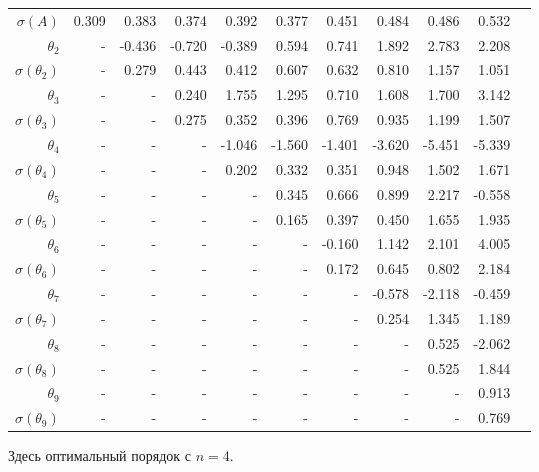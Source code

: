 \documentclass{matmex-diploma-custom}
\begin{document}
\begin{table}[h!!]
\begin{tabular}{r|rrr|r|rrrrrr}
 $\sigma(A) $ & 0.309       &   0.383 &   0.374 &   0.392 &   0.377 &   0.451 &   0.484 &   0.486 &   0.532 \\
 $\theta_2$&-        &  -0.436 &   -0.720 &  -0.389 &   0.594 &   0.741 &   1.892 &   2.783 &   2.208 \\
 $\sigma(\theta_2)$&-      &   0.279 &   0.443 &   0.412 &   0.607 &   0.632 &    0.810 &   1.157 &   1.051 \\
 $\theta_3$&-      &    - &   0.240 &   1.755 &   1.295 &   0.710 &   1.608 &   1.700 &   3.142 \\
 $\sigma(\theta_3)$&-      &    - &   0.275 &   0.352 &   0.396 &   0.769 &   0.935 &   1.199 &   1.507 \\
 $\theta_4$&-      &    - &    - &  -1.046 &  -1.560 &  -1.401 &  -3.620 &  -5.451 &  -5.339 \\
 $\sigma(\theta_4)$&-      &    - &    - &   0.202 &   0.332 &   0.351 &   0.948 &   1.502 &   1.671 \\
 $\theta_5$&-      &    - &    - &    - &  0.345 &   0.666 &   0.899 &   2.217 &  -0.558 \\
 $\sigma(\theta_5)$&-      &    - &    - &    - &   0.165 &   0.397 &   0.450 &   1.655 &   1.935 \\
 $\theta_6$&-      &    - &    - &    - &    - &   -0.160 &   1.142 &   2.101 &   4.005 \\
 $\sigma(\theta_6)$&-    &    - &    - &    - &    - &  0.172 &   0.645 &   0.802 &   2.184 \\
 $\theta_7$&-     &    - &    - &    - &    - &    - &  -0.578 &  -2.118 &  -0.459 \\
 $ \sigma(\theta_7)$&-     &    - &    - &    - &    - &    - &    0.254 &   1.345 &   1.189 \\
 $\theta_8$&-     &    - &    - &    - &    - &    - &    - &   0.525 &  -2.062 \\
 $ \sigma(\theta_8)$&-     &    - &    - &    - &    - &    - &    - &   0.525 &   1.844 \\
 $\theta_9$&-     &    - &    - &    - &    - &    - &    - &    - &  0.913 \\
 $ \sigma(\theta_9)$&-     &    - &    - &    - &    - &    - &    - &    - &   0.769 \\
\end{tabular}
\end{table}

\par Здесь оптимальный порядок с $n=4$.
\end{document}
